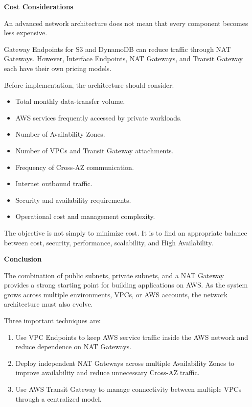 \vspace{0.5em}\noindent\textbf{Cost Considerations}\par

An advanced network architecture does not mean that every component
becomes less expensive.

Gateway Endpoints for S3 and DynamoDB can reduce traffic through NAT
Gateways. However, Interface Endpoints, NAT Gateways, and Transit
Gateway each have their own pricing models.

Before implementation, the architecture should consider:

\begin{itemize}
\tightlist
\item
  Total monthly data-transfer volume.
\item
  AWS services frequently accessed by private workloads.
\item
  Number of Availability Zones.
\item
  Number of VPCs and Transit Gateway attachments.
\item
  Frequency of Cross-AZ communication.
\item
  Internet outbound traffic.
\item
  Security and availability requirements.
\item
  Operational cost and management complexity.
\end{itemize}

The objective is not simply to minimize cost. It is to find an
appropriate balance between cost, security, performance, scalability,
and High Availability.

\vspace{0.5em}\noindent\textbf{Conclusion}\par

The combination of public subnets, private subnets, and a NAT Gateway
provides a strong starting point for building applications on AWS. As
the system grows across multiple environments, VPCs, or AWS accounts,
the network architecture must also evolve.

Three important techniques are:

\begin{enumerate}
\def\labelenumi{\arabic{enumi}.}
\tightlist
\item
  Use VPC Endpoints to keep AWS service traffic inside the AWS network
  and reduce dependence on NAT Gateways.
\item
  Deploy independent NAT Gateways across multiple Availability Zones to
  improve availability and reduce unnecessary Cross-AZ traffic.
\item
  Use AWS Transit Gateway to manage connectivity between multiple VPCs
  through a centralized model.
\end{enumerate}

